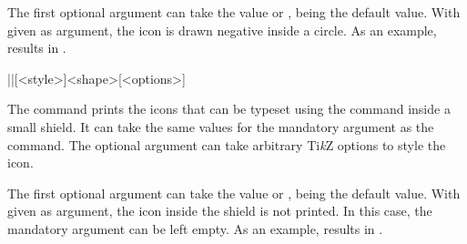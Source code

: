 \documentclass[a4paper]{article}
\begin{document}
The first optional argument can take the value  or ,  being the default value. With  given as argument, the icon is drawn negative inside a circle. As an example,  results in .

\begin{macrodef}|\saving|[<style>]{<shape>}[<options>]\end{macrodef}
The command \macro{\saving} prints the icons that can be typeset using the \macro{\ability} command inside a small shield. It can take the same values for the mandatory argument as the \macro{\ability} command. The optional argument can take arbitrary Ti\emph{k}Z options to style the icon.

The first optional argument can take the value  or ,  being the default value. With  given as argument, the icon inside the shield is not printed. In this case, the mandatory argument can be left empty. As an example, \macro{\saving[empty]{}} results in \saving[empty]{}. 
\end{document}
